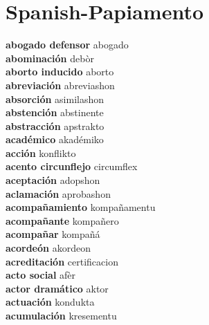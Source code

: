 \twocolumn
\chapter{Spanish-Papiamento}
\small
{}\textbf{ abogado defensor  } abogado \\
\textbf{ abominación  } debòr \\
\textbf{ aborto inducido  } aborto \\
\textbf{ abreviación  } abreviashon \\
\textbf{ absorción  } asimilashon \\
\textbf{ abstención  } abstinente \\
\textbf{ abstracción  } apstrakto \\
\textbf{ académico  } akadémiko \\
\textbf{ acción  } konflikto \\
\textbf{ acento circunflejo  } circumflex \\
\textbf{ aceptación  } adopshon \\
\textbf{ aclamación  } aprobashon \\
\textbf{ acompañamiento  } kompañamentu \\
\textbf{ acompañante  } kompañero \\
\textbf{ acompañar  } kompañá \\
\textbf{ acordeón  } akordeon \\
\textbf{ acreditación  } certificacion \\
\textbf{ acto social  } afèr \\
\textbf{ actor dramático  } aktor \\
\textbf{ actuación  } kondukta \\
\textbf{ acumulación  } kresementu \\
